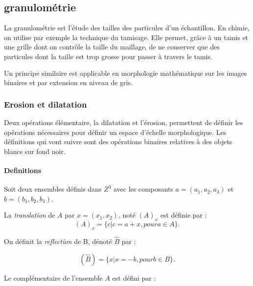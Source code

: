 
\subsection{granulométrie}
\label{sec:EA:rehaussement:echelle:granulometrie}

La granulométrie est l'étude des tailles des particules d'un échantillon. En chimie, on utilise par exemple la technique du tamisage. Elle permet, grâce à un tamis et une grille dont on contrôle la taille du maillage, de ne conserver que des particules dont la taille est trop grosse pour passer à travers le tamis.

Un principe similaire est applicable en morphologie mathématique sur les images binaires et par extension en niveau de gris.

\subsubsection{Erosion et dilatation }

Deux opérations élémentaire, la dilatation et l'érosion, permettent de définir les opérations nécessaires pour définir un espace d'échelle morphologique. Les définitions qui vont suivre sont des opérations binaires relatives à des objets blancs sur fond noir.

\paragraph{Definitions}
Soit deux ensembles définis dans $Z^3$ avec les composants $a=(a_1,a_2,a_3)$ et $b=(b_1,b_2,b_3)$.

La \emph{translation} de $A$ par $x = (x_1,x_2)$, noté $(A)_x$ est définie par :
\begin{equation}
  (A)_x = \{c|c = a+x, pour a \in A\}. 
\end{equation}

On définit la \emph{reflection} de B, dénoté $\widehat{B}$ par :

\begin{equation}
  (\widehat{B}) = \{x|x = -b, pour b \in B\}. 
\end{equation}

Le complémentaire de l'ensemble $A$ est défini par :

